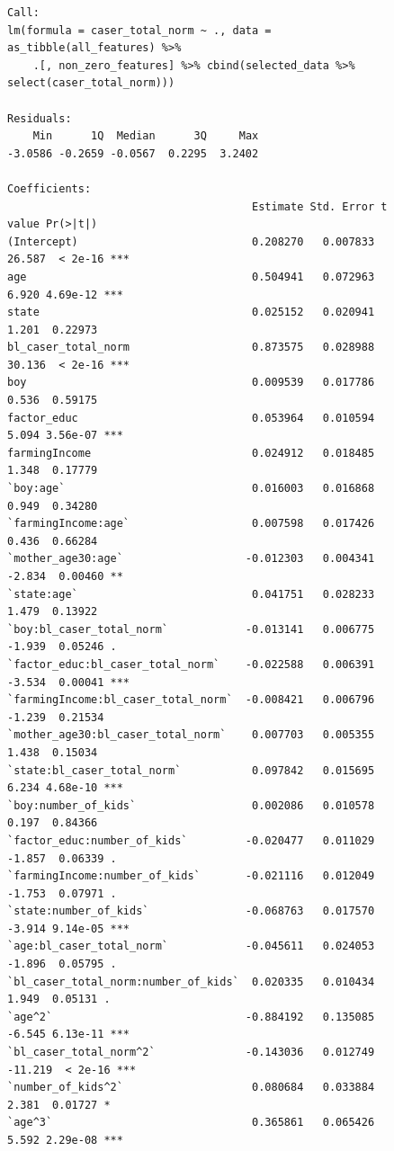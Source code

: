 \documentclass{article}
\begin{document}
\begin{figure}[H]
\begin{lstlisting}[style=RstyleComment, caption=CATE with Controls selected by LASSO]
Call:
lm(formula = caser_total_norm ~ ., data = as_tibble(all_features) %>% 
    .[, non_zero_features] %>% cbind(selected_data %>% select(caser_total_norm)))

Residuals:
    Min      1Q  Median      3Q     Max 
-3.0586 -0.2659 -0.0567  0.2295  3.2402 

Coefficients:
                                      Estimate Std. Error t value Pr(>|t|)    
(Intercept)                           0.208270   0.007833  26.587  < 2e-16 ***
age                                   0.504941   0.072963   6.920 4.69e-12 ***
state                                 0.025152   0.020941   1.201  0.22973    
bl_caser_total_norm                   0.873575   0.028988  30.136  < 2e-16 ***
boy                                   0.009539   0.017786   0.536  0.59175    
factor_educ                           0.053964   0.010594   5.094 3.56e-07 ***
farmingIncome                         0.024912   0.018485   1.348  0.17779    
`boy:age`                             0.016003   0.016868   0.949  0.34280    
`farmingIncome:age`                   0.007598   0.017426   0.436  0.66284    
`mother_age30:age`                   -0.012303   0.004341  -2.834  0.00460 ** 
`state:age`                           0.041751   0.028233   1.479  0.13922    
`boy:bl_caser_total_norm`            -0.013141   0.006775  -1.939  0.05246 .  
`factor_educ:bl_caser_total_norm`    -0.022588   0.006391  -3.534  0.00041 ***
`farmingIncome:bl_caser_total_norm`  -0.008421   0.006796  -1.239  0.21534    
`mother_age30:bl_caser_total_norm`    0.007703   0.005355   1.438  0.15034    
`state:bl_caser_total_norm`           0.097842   0.015695   6.234 4.68e-10 ***
`boy:number_of_kids`                  0.002086   0.010578   0.197  0.84366    
`factor_educ:number_of_kids`         -0.020477   0.011029  -1.857  0.06339 .  
`farmingIncome:number_of_kids`       -0.021116   0.012049  -1.753  0.07971 .  
`state:number_of_kids`               -0.068763   0.017570  -3.914 9.14e-05 ***
`age:bl_caser_total_norm`            -0.045611   0.024053  -1.896  0.05795 .  
`bl_caser_total_norm:number_of_kids`  0.020335   0.010434   1.949  0.05131 .  
`age^2`                              -0.884192   0.135085  -6.545 6.13e-11 ***
`bl_caser_total_norm^2`              -0.143036   0.012749 -11.219  < 2e-16 ***
`number_of_kids^2`                    0.080684   0.033884   2.381  0.01727 *  
`age^3`                               0.365861   0.065426   5.592 2.29e-08 ***

\end{lstlisting}
\end{figure}
\end{document}

